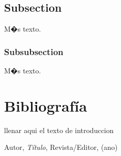 \documentclass{article}
\theoremstyle{definition}
\theoremstyle{remark}
\begin{document}
\subsection{Subsection}\label{sec:nada}

M�s texto.

\subsubsection{Subsubsection}\label{sec:nada2}

M�s texto.





\section{Bibliograf\'ia}

llenar aqui el texto de introduccion








\begin{thebibliography}{99}

 Autor, \emph{T\'itulo}, Revista/Editor, (ano)

\end{thebibliography}
\end{document}
